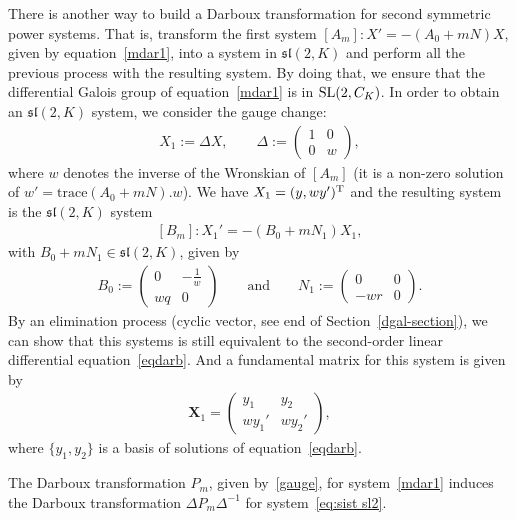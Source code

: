\documentclass[10pt,a4paper]{amsart}
\numberwithin{equation}{section}
\begin{document}
There is another way to build a Darboux transformation for second symmetric power systems. That is, transform the first system $[A_m]\colon X'=-(A_0+mN) X$, given by equation~\eqref{mdar1}, into a system in $\mathfrak{sl} (2,K)$ and perform all the previous process with the resulting system. By doing that, we ensure that the differential Galois group of equation~\eqref{mdar1}
is in ${\rm SL}(2, C_K)$.
In order to obtain an $\mathfrak{sl} (2,K)$ system, we consider the gauge change:
\begin{gather} \label{eq:gauge sl2}
X_{1}:=\Delta X , \qquad
\Delta:= \begin{pmatrix} 1&0 \\ 0 & w \end{pmatrix}\!,
\end{gather}
where $w$ denotes the inverse of the Wronskian of $[A_m]$
(it is a non-zero solution of $w'=\textrm{trace}(A_0+mN).w$). We have
$X_{1} = (y, {w}y')^{\rm T} $ and the resulting system is the $\mathfrak{sl} (2,K)$ system
\begin{gather}\label{eq:sist sl2}
 [B_{m}]\colon X_{1}'=-(B_0+mN_1) X_{1} ,
\end{gather}
with $B_0 + mN_1 \in \mathfrak{sl}(2,K)$, given by
\begin{gather*}
B_0:= \begin{pmatrix} 0& - \frac{1}{w}\\ wq&0 \end{pmatrix} \qquad \text{and} \qquad
N_1:= \begin{pmatrix} 0&0\\ -wr&0 \end{pmatrix}\!.
\end{gather*}
By an elimination process (cyclic vector, see end of Section~\ref{dgal-section}), we can show that this systems is still equivalent to the second-order linear differential equation~\eqref{eqdarb}.
And a fundamental matrix for this system is given by
\begin{gather}\label{eq:sol-fund-gaug-2}
 \mathbf{X}_{1} = \begin{pmatrix} y_1 & y_2 \\ wy_1' & w y_2' \end{pmatrix}\!,
\end{gather}
where $\{ y_1, y_2 \}$ is a basis of solutions of equation~\eqref{eqdarb}.

The Darboux transformation $P_m$, given by~\eqref{gauge}, for system~\eqref{mdar1} induces the Darboux transformation $\Delta P_m \Delta^{-1}$ for system~\eqref{eq:sist sl2}.
\end{document}
